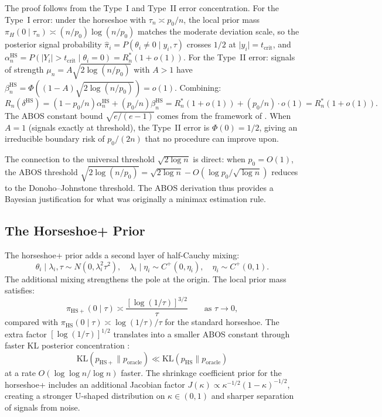 \documentclass[12pt]{article}
\newcommand{\KL}{\mathrm{KL}}
\newcommand{\abs}[1]{\lvert #1 \rvert}
\newcommand{\piH}{\pi_H}
\newcommand{\tcrit}{t_{\mathrm{crit}}}
\begin{document}
The proof follows from the Type~I and Type~II error concentration. For the Type~I error: under the horseshoe with $\tau_n \asymp p_0/n$, the local prior mass $\piH(0 \mid \tau_n) \asymp (n/p_0)\log(n/p_0)$ matches the moderate deviation scale, so the posterior signal probability $\hat{\pi}_i = P(\theta_i \neq 0 \mid y_i, \tau)$ crosses $1/2$ at $\abs{y_i} = \tcrit$, and $\alpha_n^{\mathrm{HS}} = P(\abs{Y_i} > \tcrit \mid \theta_i = 0) = R_n^*(1 + o(1))$. For the Type~II error: signals of strength $\mu_n = A\sqrt{2\log(n/p_0)}$ with $A > 1$ have $\beta_n^{\mathrm{HS}} = \Phi((1-A)\sqrt{2\log(n/p_0)}) = o(1)$. Combining:
\[
  R_n(\delta^{\mathrm{HS}}) = (1 - p_0/n)\alpha_n^{\mathrm{HS}} + (p_0/n)\beta_n^{\mathrm{HS}} = R_n^*(1+o(1)) + (p_0/n) \cdot o(1) = R_n^*(1+o(1)).
\]
The ABOS constant bound $\sqrt{e/(e-1)}$ comes from the framework of \citet{bogdan2011asymptotic}. When $A = 1$ (signals exactly at threshold), the Type~II error is $\Phi(0) = 1/2$, giving an irreducible boundary risk of $p_0/(2n)$ that no procedure can improve upon.

The connection to the \citet{donoho1994ideal} universal threshold $\sqrt{2\log n}$ is direct: when $p_0 = O(1)$, the ABOS threshold $\sqrt{2\log(n/p_0)} = \sqrt{2\log n} - O(\log p_0/\sqrt{\log n})$ reduces to the Donoho--Johnstone threshold. The ABOS derivation thus provides a Bayesian justification for what was originally a minimax estimation rule.

\subsection{The Horseshoe+ Prior}\label{sec:hsplus}

The horseshoe+ prior \citep{bhadra2017horseshoe} adds a second layer of half-Cauchy mixing:
\begin{equation}\label{eq:hsplus}
  \theta_i \mid \lambda_i, \tau \sim N(0, \lambda_i^2\tau^2), \quad
  \lambda_i \mid \eta_i \sim C^+(0, \eta_i), \quad
  \eta_i \sim C^+(0,1).
\end{equation}
The additional mixing strengthens the pole at the origin. The local prior mass satisfies:
\begin{equation}\label{eq:hsplus-mass}
  \pi_{\mathrm{HS+}}(0 \mid \tau) \asymp \frac{[\log(1/\tau)]^{3/2}}{\tau} \qquad\text{as } \tau \to 0,
\end{equation}
compared with $\pi_{\mathrm{HS}}(0 \mid \tau) \asymp \log(1/\tau)/\tau$ for the standard horseshoe. The extra factor $[\log(1/\tau)]^{1/2}$ translates into a smaller ABOS constant through faster KL posterior concentration \citep{bhadra2017horseshoe}:
\begin{equation}\label{eq:hsplus-kl}
  \KL(p_{\mathrm{HS+}} \| p_{\mathrm{oracle}}) \ll \KL(p_{\mathrm{HS}} \| p_{\mathrm{oracle}})
\end{equation}
at a rate $O(\log\log n / \log n)$ faster. The shrinkage coefficient prior for the horseshoe+ includes an additional Jacobian factor $J(\kappa) \propto \kappa^{-1/2}(1-\kappa)^{-1/2}$, creating a stronger U-shaped distribution on $\kappa \in (0,1)$ and sharper separation of signals from noise.
\end{document}
